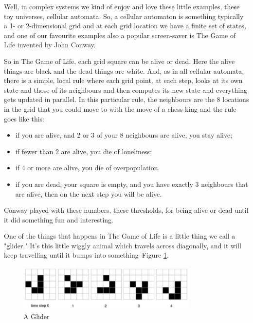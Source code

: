 \documentclass[]{article}
\begin{document}
Well, in complex systems we kind of enjoy and love these little examples, these toy universes, cellular automata. So, a cellular automaton is something typically a 1- or 2-dimensional grid and at each grid location we have a finite set of states, and one of our favourite examples also a popular screen-saver is The Game of Life invented by John Conway.

So in The Game of Life, each grid square can be alive or dead. Here the alive things are black and the dead things are white. And, as in all cellular automata, there is a simple, local rule where each grid point, at each step, looks at
its own state and those of its neighbours and then computes its new state and everything gets updated in parallel. In this particular rule, the neighbours are the 8 locations
in the grid that you could move to with the move of a chess king and the rule goes like this:
\begin{itemize}
	\item if you are alive, and 2 or 3 of your 8 neighbours are alive, you stay alive;
	\item if fewer than 2 are alive, you die of loneliness;
	\item if 4 or more are alive, you die of overpopulation.
	\item if you are dead, your square is empty, and you have exactly 3 neighbours 	that are alive, then on the next step 	you will be alive.
\end{itemize}

Conway played with these numbers, these thresholds, for being alive or dead until it did something fun and interesting.

One of the things that happens in The Game of Life is a little thing we call a "glider." It's this little wiggly animal which travels across diagonally, and it will keep travelling until it bumps into something--Figure \ref{fig:life-glider}.

\begin{figure}[H]
	\begin{center}
		\caption[Glider]{A Glider\cite{dorin2012framework}}\label{fig:life-glider}
		\includegraphics[width=0.8\textwidth]{life-glider}
	\end{center}
\end{figure}
\end{document}
